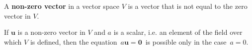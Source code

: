 \documentclass[12pt]{article}
\begin{document}
A {\bf non-zero vector} in a vector space $V$ is a vector that is not equal to
the zero vector in $V$.

If $\mathbf{u}$ is a non-zero vector in $V$ and $a$ is a scalar, 
i.e. an element of the field over which $V$ 
is defined, then the equation\, $a\mathbf{u} = \mathbf{0}$\, is 
possible only in the case\, $a = 0$.
\end{document}
